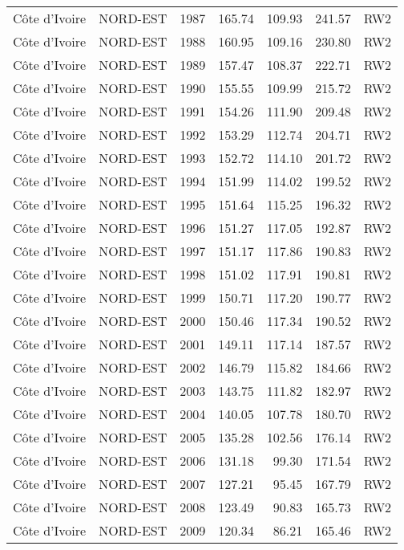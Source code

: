 \begin{longtable}{lllrrrl}
  C\^{o}te d'Ivoire & NORD-EST & 1987 & 165.74 & 109.93 & 241.57 & RW2 \\ 
  C\^{o}te d'Ivoire & NORD-EST & 1988 & 160.95 & 109.16 & 230.80 & RW2 \\ 
  C\^{o}te d'Ivoire & NORD-EST & 1989 & 157.47 & 108.37 & 222.71 & RW2 \\ 
  C\^{o}te d'Ivoire & NORD-EST & 1990 & 155.55 & 109.99 & 215.72 & RW2 \\ 
  C\^{o}te d'Ivoire & NORD-EST & 1991 & 154.26 & 111.90 & 209.48 & RW2 \\ 
  C\^{o}te d'Ivoire & NORD-EST & 1992 & 153.29 & 112.74 & 204.71 & RW2 \\ 
  C\^{o}te d'Ivoire & NORD-EST & 1993 & 152.72 & 114.10 & 201.72 & RW2 \\ 
  C\^{o}te d'Ivoire & NORD-EST & 1994 & 151.99 & 114.02 & 199.52 & RW2 \\ 
  C\^{o}te d'Ivoire & NORD-EST & 1995 & 151.64 & 115.25 & 196.32 & RW2 \\ 
  C\^{o}te d'Ivoire & NORD-EST & 1996 & 151.27 & 117.05 & 192.87 & RW2 \\ 
  C\^{o}te d'Ivoire & NORD-EST & 1997 & 151.17 & 117.86 & 190.83 & RW2 \\ 
  C\^{o}te d'Ivoire & NORD-EST & 1998 & 151.02 & 117.91 & 190.81 & RW2 \\ 
  C\^{o}te d'Ivoire & NORD-EST & 1999 & 150.71 & 117.20 & 190.77 & RW2 \\ 
  C\^{o}te d'Ivoire & NORD-EST & 2000 & 150.46 & 117.34 & 190.52 & RW2 \\ 
  C\^{o}te d'Ivoire & NORD-EST & 2001 & 149.11 & 117.14 & 187.57 & RW2 \\ 
  C\^{o}te d'Ivoire & NORD-EST & 2002 & 146.79 & 115.82 & 184.66 & RW2 \\ 
  C\^{o}te d'Ivoire & NORD-EST & 2003 & 143.75 & 111.82 & 182.97 & RW2 \\ 
  C\^{o}te d'Ivoire & NORD-EST & 2004 & 140.05 & 107.78 & 180.70 & RW2 \\ 
  C\^{o}te d'Ivoire & NORD-EST & 2005 & 135.28 & 102.56 & 176.14 & RW2 \\ 
  C\^{o}te d'Ivoire & NORD-EST & 2006 & 131.18 & 99.30 & 171.54 & RW2 \\ 
  C\^{o}te d'Ivoire & NORD-EST & 2007 & 127.21 & 95.45 & 167.79 & RW2 \\ 
  C\^{o}te d'Ivoire & NORD-EST & 2008 & 123.49 & 90.83 & 165.73 & RW2 \\ 
  C\^{o}te d'Ivoire & NORD-EST & 2009 & 120.34 & 86.21 & 165.46 & RW2 \\ 

\end{longtable}
